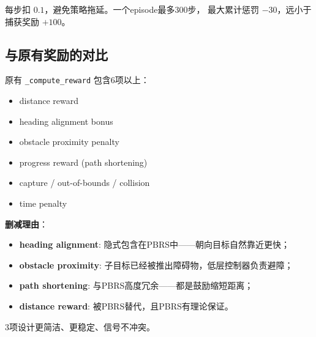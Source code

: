 \documentclass[11pt]{article}
\begin{document}
每步扣 $0.1$，避免策略拖延。一个episode最多300步，
最大累计惩罚 $-30$，远小于捕获奖励 $+100$。

\subsection{与原有奖励的对比}

原有 \texttt{\_compute\_reward} 包含6项以上：
\begin{itemize}
  \item distance reward
  \item heading alignment bonus
  \item obstacle proximity penalty
  \item progress reward (path shortening)
  \item capture / out-of-bounds / collision
  \item time penalty
\end{itemize}

\textbf{删减理由}：
\begin{itemize}
  \item \textbf{heading alignment}: 隐式包含在PBRS中——朝向目标自然靠近更快；
  \item \textbf{obstacle proximity}: 子目标已经被推出障碍物，低层控制器负责避障；
  \item \textbf{path shortening}: 与PBRS高度冗余——都是鼓励缩短距离；
  \item \textbf{distance reward}: 被PBRS替代，且PBRS有理论保证。
\end{itemize}

3项设计更简洁、更稳定、信号不冲突。
\end{document}
